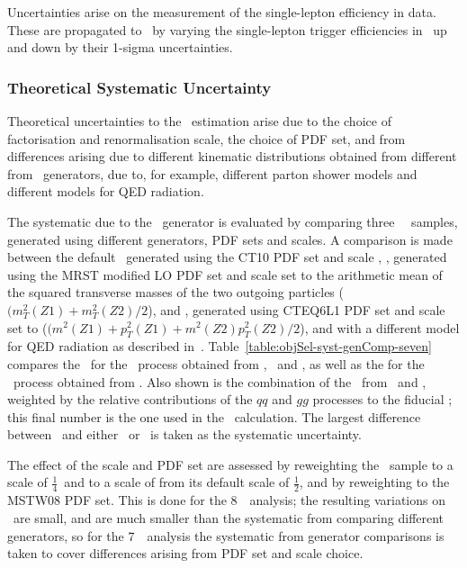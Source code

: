 Uncertainties arise on the measurement of the single-lepton efficiency in data.
These are propagated to \CZZ\ by varying the single-lepton trigger efficiencies
in~ up and down by their 1-sigma uncertainties.

\subsubsection{Theoretical Systematic Uncertainty}

Theoretical uncertainties to the \CZZ\ estimation arise due to the choice of
factorisation and renormalisation scale, the choice of PDF set, and from differences
arising due to different kinematic distributions obtained from different from \mc\
generators, due to, for example, different parton shower models and different
models for QED radiation.

The systematic due to the \mc\ generator is evaluated by comparing three \qqZZ\ \mc\ samples, generated
using different generators, PDF sets and scales. A
comparison is made between the default \powhegbox\ generated using the CT10 PDF
set and scale \mZZ, \pythia, generated using the MRST modified LO PDF set and scale
set to the arithmetic mean of the squared transverse masses of the two outgoing
particles ($(m^{2}_{T}(Z1)+m^{2}_{T}(Z2)/2$), and
\sherpa, generated using CTEQ6L1 PDF set and scale set to
($(m^{2}_{}(Z1)+p^{2}_{T}(Z1)+m^{2}_{}(Z2)p^{2}_{T}(Z2)/2$), and with a different
model for QED radiation as described in~\sec{gen-comparisons}.
Table~\ref{table:objSel-syst-genComp-seven} compares the \CZZ\ for the \qqZZ\
process obtained from \powhegbox, \sherpa\ and \pythia, as well as the for the
\ggZZ\ process obtained from \ggtwoZZ. Also shown is the combination of
the \CZZ\ from \powhegbox\ and \ggtwoZZ, weighted by the relative contributions
of the $qq$ and $gg$ processes to the fiducial \cx; this final number is the one
used in the \cx\ calculation. The largest difference between \powhegbox\ and
either \pythia\ or \sherpa\ is taken as the systematic uncertainty.

The effect of the scale and PDF set are assessed by
reweighting the \powhegbox\ sample to a scale of $\frac{1}{4}$\mZZ\ and to a
scale of \mZZ from its default scale of $\frac{1}{2}$\mZZ, and by reweighting
to the MSTW08 PDF set. This is done for the 8~\tev\ analysis; the resulting
variations on \CZZ\ are small, and are much smaller than the systematic from comparing
different generators, so for the 7~\tev\ analysis the systematic from generator
comparisons is taken to cover differences arising from PDF set and scale choice.

